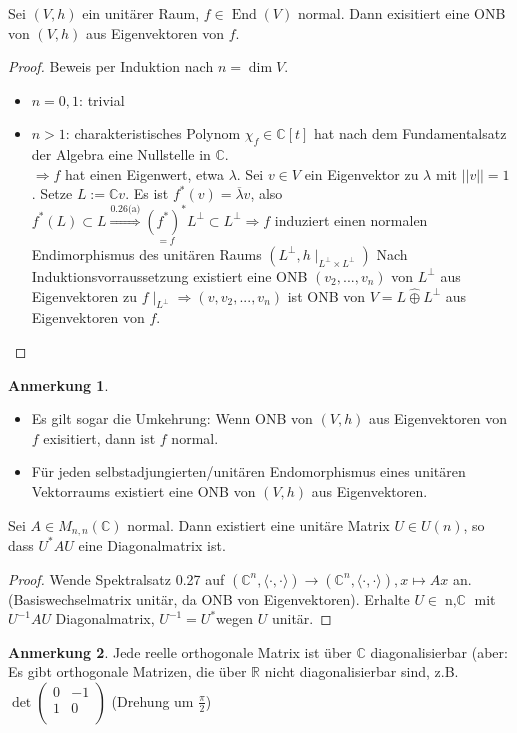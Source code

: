 \documentclass[a4paper, titlepage]{article}
\theoremstyle{definition}
\newtheorem*{anm}{Anmerkung}
\newcommand{\R}{\mathbb{R}}
\newcommand{\C}{\mathbb{C}}
\begin{document}
\begin{satz}
Sei $(V,h)$ ein unitärer Raum, $f\in \operatorname{End}(V)$\newline
normal. Dann exisitiert eine ONB von $(V,h)$ aus Eigenvektoren von $f$.
\end{satz}
\begin{proof}
Beweis per Induktion nach $n=\operatorname{dim}V$.
\begin{itemize}
\item$n=0,1$: trivial
\item $n>1$: charakteristisches Polynom $\chi_f\in \C[t]$ hat nach dem Fundamentalsatz der Algebra eine Nullstelle in $\C$.\\
$\Rightarrow f$ hat einen Eigenwert, etwa $\lambda$.
Sei $v\in V$ ein Eigenvektor zu $\lambda$ mit $||v||=1$. Setze $L := \C v$. Es ist $f^{*}(v) = \overline{\lambda}v$, also $f^{*}(L) \subset L \overset{0.26 \text{(a)}}{\Rightarrow} \underset{=f}{(f^{*})^{*}}L^{\bot}\subset L^{\bot} \Rightarrow f$ induziert einen normalen Endimorphismus des unitären Raums $(L^{\bot},h\mid_{L^{\bot}\times L^{\bot}})$ Nach Induktionsvorraussetzung existiert eine ONB $(v_2,...,v_n)$ von $L^{\bot}$ aus Eigenvektoren zu $f\mid_{L^{\bot}}
	\Rightarrow (v,v_2,...,v_n) $ ist ONB von $V= L \hat{\oplus}L^{\bot} $ aus Eigenvektoren von $f$.
	\end{itemize}
    \end{proof}
    \begin{anm}
\begin{itemize}
	\item Es gilt sogar die Umkehrung: Wenn ONB von $(V,h)$ aus Eigenvektoren von $f$ exisitiert, dann ist $f$ normal.
	\item Für jeden selbstadjungierten/unitären Endomorphismus eines unitären Vektorraums existiert eine ONB von $(V,h)$ aus Eigenvektoren.
\end{itemize}
\end{anm}
\begin{lemma}
	Sei $A\in M_{n,n}(\C)$ normal. Dann existiert eine unitäre Matrix $U\in U(n)$, so dass $U^{*}AU$ eine Diagonalmatrix ist.
	\end{lemma}
\begin{proof}
	Wende Spektralsatz 0.27 auf $(\C^n, \langle \cdot, \cdot \rangle) \longrightarrow (\C^n, \langle \cdot, \cdot \rangle), x \mapsto Ax$ an. (Basiswechselmatrix unitär, da ONB von Eigenvektoren). Erhalte $U\in \operatorname{n,\C}$ mit $U^{-1}AU$ Diagonalmatrix, $U^{-1} = U^{*} $wegen $U$ unitär. 	
    \end{proof}
    \begin{anm}
Jede reelle orthogonale Matrix ist über $\C$ diagonalisierbar (aber: Es gibt orthogonale Matrizen, die über $\R$ nicht diagonalisierbar sind, z.B. $\operatorname{det}\left(\begin{matrix}
	{0}&{ -1 }\\
	{ 1 }&{0  }\\
	\end{matrix}\right)$
(Drehung um $\frac{\pi}{2}$)
\end{anm}
\newpage
\end{document}
